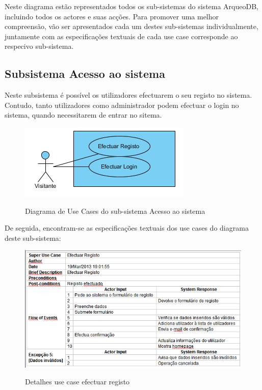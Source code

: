 ﻿\documentclass[12pt,a4paper]{article}
\begin{document}
\clearpage

Neste diagrama estão representados todos os sub-sistemas do sistema ArqueoDB, incluindo todos os actores e suas acções. Para promover uma  melhor compreensão, vão ser apresentados cada um destes sub-sistemas individualmente, juntamente com as especificações textuais de cada use case corresponde ao respecivo sub-sistema. \\

\clearpage
\subsection{Subsistema Acesso ao sistema}
Neste subsistema é possível os utilizadores efectuarem o seu registo no sistema. Contudo, tanto utilizadores como administrador podem efectuar o login no sistema, quando necessitarem de entrar no sitema.\\

\begin{figure}[h!]
\centering
\includegraphics[scale=1]{usecase/U_AcessoSistema}
\label{usecase}
\caption{Diagrama de Use Cases do sub-sistema Acesso ao sistema}
\end{figure}

De seguida, encontram-se as especificações textuais dos use cases do diagrama deste sub-sistema:\\

\begin{figure}[h!]
\centering
\includegraphics[scale=0.7]{d_usecase/registo}
\label{usecase}
\caption{Detalhes use case efectuar registo}
\end{figure}
\end{document}
